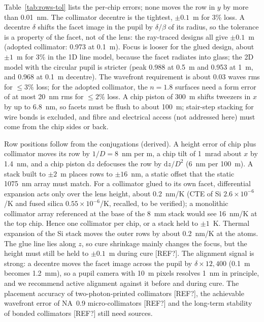 Table~\ref{tab:rows-tol} lists the per-chip errors; none moves the row in $y$ by more than 0.01~nm. The
collimator decentre is the tightest, $\pm0.1$~\textmu m for 3\% loss. A decentre $\delta$ shifts the facet image
in the pupil by $\delta/\beta$ of its radius, so the tolerance is a property of the facet, not of the lens: the
ray-traced designs all give $\pm0.1$~\textmu m (adopted collimator: 0.973 at 0.1~\textmu m). Focus is looser for
the glued design, about $\pm1$~\textmu m for 3\% in the 1D line model, because the facet radiates into glass; the 2D
model with the circular pupil is stricter (peak 0.988 at 0.5~\textmu m and 0.953 at 1~\textmu m, and 0.968 at 0.1~\textmu m decentre). The wavefront
requirement is about 0.03 waves rms for $\le3\%$ loss; for the adopted collimator, the $n=1.8$ surfaces need a form
error of at most 20~nm rms for $\le2\%$ loss. A chip piston of 300~\textmu m shifts tweezers in $x$ by up to 6.8~nm, so facets must be
flush to about 100~\textmu m; stair-step stacking for wire bonds is excluded, and fibre and electrical access
(not addressed here) must come from the chip sides or back.

Row positions follow from the conjugations (derived). A height error of chip plus collimator moves its row by
$1/D=8$~nm per \textmu m, a chip tilt of 1~mrad about $x$ by 1.4~nm, and a chip piston $\mathrm{d}z$ defocuses
the row by $\mathrm{d}z/D^2$ (6~nm per 100~\textmu m). A stack built to $\pm2$~\textmu m places rows to
$\pm16$~nm, a static offset that the static 1075~nm array must match. For a collimator glued to its own facet,
differential expansion acts only over the lens height, about 0.2~nm/K (CTE of Si $2.6\times10^{-6}$/K and fused
silica $0.55\times10^{-6}$/K, recalled, to be verified); a monolithic collimator array referenced at the base of
the 8~mm stack would see 16~nm/K at the top chip. Hence one collimator per chip, or a stack held to $\pm1$~K.
Thermal expansion of the Si stack moves the outer rows by about 0.2~nm/K at the atoms. The glue line lies along
$z$, so cure shrinkage mainly changes the focus, but the height must still be held to $\pm0.1$~\textmu m during
cure [REF?]. The alignment signal is strong: a decentre moves the facet image across the pupil by
$\delta\times12{,}400$ (0.1~\textmu m becomes 1.2~mm), so a pupil camera with 10~\textmu m pixels resolves 1~nm
in principle, and we recommend active alignment against it before and during cure. The placement accuracy of
two-photon-printed collimators [REF?], the achievable wavefront error of NA~0.9 micro-collimators [REF?] and the
long-term stability of bonded collimators [REF?] still need sources.

